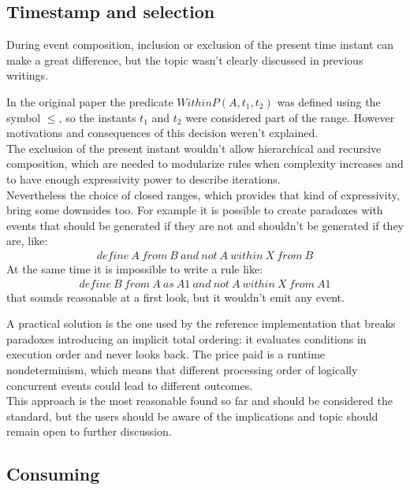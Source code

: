 \subsection{Timestamp and selection}
During event composition, inclusion or exclusion of the present time instant can make a great difference, but the topic wasn't clearly discussed in previous writings.

In the original paper the predicate $WithinP(A, t_1, t_2)$ was defined using the symbol $\le$, so the instants $t_1$ and $t_2$ were considered part of the range. However motivations and consequences of this decision weren't explained.\\
The exclusion of the present instant wouldn't allow hierarchical and recursive composition, which are needed to modularize rules when complexity increases and to have enough expressivity power to describe iterations.\\
Nevertheless the choice of closed ranges, which provides that kind of expressivity, bring some downsides too. For example it is possible to create paradoxes with events that should be generated if they are not and shouldn't be generated if they are, like:
\begin{align*}
define\ A\ from\ B\ and\ not\ A\ within\ X\ from\ B
\end{align*}
At the same time it is impossible to write a rule like:
\begin{align*}
define\ B\ from\ A\ as\ A1\ and\ not\ A\ within\ X\ from\ A1
\end{align*}
that sounds reasonable at a first look, but it wouldn't emit any event.

A practical solution is the one used by the reference implementation that breaks paradoxes introducing an implicit total ordering: it evaluates conditions in execution order and never looks back. The price paid is a runtime nondeterminism, which means that different processing order of logically concurrent events could lead to different outcomes.\\
This approach is the most reasonable found so far and should be considered the standard, but the users should be aware of the implications and topic should remain open to further discussion.

\subsection{Consuming}
